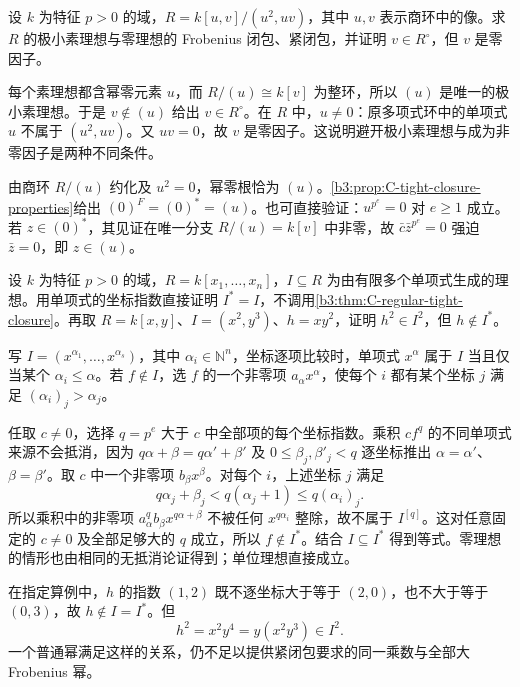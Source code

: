 
\begin{exercise}\label{b3:ex:C-tight-minimal-primes}
	设 \(k\) 为特征 \(p>0\) 的域，\(R=k[u,v]/(u^2,uv)\)，其中 \(u,v\) 表示商环中的像。求 \(R\) 的极小素理想与零理想的 Frobenius 闭包、紧闭包，并证明 \(v\in R^\circ\)，但 \(v\) 是零因子。
\end{exercise}
\begin{solution}
	每个素理想都含幂零元素 \(u\)，而 \(R/(u)\cong k[v]\) 为整环，所以 \((u)\) 是唯一的极小素理想。于是 \(v\notin(u)\) 给出 \(v\in R^\circ\)。在 \(R\) 中，\(u\ne0\)：原多项式环中的单项式 \(u\) 不属于 \((u^2,uv)\)。又 \(uv=0\)，故 \(v\) 是零因子。这说明避开极小素理想与成为非零因子是两种不同条件。

	由商环 \(R/(u)\) 约化及 \(u^2=0\)，幂零根恰为 \((u)\)。\cref{b3:prop:C-tight-closure-properties}给出 \((0)^F=(0)^*=(u)\)。也可直接验证：\(u^{p^e}=0\) 对 \(e\ge1\) 成立。若 \(z\in(0)^*\)，其见证在唯一分支 \(R/(u)=k[v]\) 中非零，故 \(\bar c\bar z^{p^e}=0\) 强迫 \(\bar z=0\)，即 \(z\in(u)\)。
\end{solution}

\begin{exercise}\label{b3:ex:C-tight-polynomial-monomials}
	设 \(k\) 为特征 \(p>0\) 的域，\(R=k[x_1,\ldots,x_n]\)，\(I\subseteq R\) 为由有限多个单项式生成的理想。用单项式的坐标指数直接证明 \(I^*=I\)，不调用\cref{b3:thm:C-regular-tight-closure}。再取 \(R=k[x,y]\)、\(I=(x^2,y^3)\)、\(h=xy^2\)，证明 \(h^2\in I^2\)，但 \(h\notin I^*\)。
\end{exercise}
\begin{solution}
	写 \(I=(x^{\alpha_1},\ldots,x^{\alpha_s})\)，其中 \(\alpha_i\in\mathbb N^n\)，坐标逐项比较时，单项式 \(x^\alpha\) 属于 \(I\) 当且仅当某个 \(\alpha_i\le\alpha\)。若 \(f\notin I\)，选 \(f\) 的一个非零项 \(a_\alpha x^\alpha\)，使每个 \(i\) 都有某个坐标 \(j\) 满足 \((\alpha_i)_j>\alpha_j\)。

	任取 \(c\ne0\)，选择 \(q=p^e\) 大于 \(c\) 中全部项的每个坐标指数。乘积 \(cf^q\) 的不同单项式来源不会抵消，因为 \(q\alpha+\beta=q\alpha'+\beta'\) 及 \(0\le\beta_j,\beta'_j<q\) 逐坐标推出 \(\alpha=\alpha'\)、\(\beta=\beta'\)。取 \(c\) 中一个非零项 \(b_\beta x^\beta\)。对每个 \(i\)，上述坐标 \(j\) 满足
	\[
		q\alpha_j+\beta_j<q(\alpha_j+1)
		\le q(\alpha_i)_j.
	\]
	所以乘积中的非零项 \(a_\alpha^q b_\beta x^{q\alpha+\beta}\) 不被任何 \(x^{q\alpha_i}\) 整除，故不属于 \(I^{[q]}\)。这对任意固定的 \(c\ne0\) 及全部足够大的 \(q\) 成立，所以 \(f\notin I^*\)。结合 \(I\subseteq I^*\) 得到等式。零理想的情形也由相同的无抵消论证得到；单位理想直接成立。

	在指定算例中，\(h\) 的指数 \((1,2)\) 既不逐坐标大于等于 \((2,0)\)，也不大于等于 \((0,3)\)，故 \(h\notin I=I^*\)。但
	\[
		h^2=x^2y^4=y(x^2y^3)\in I^2.
	\]
	一个普通幂满足这样的关系，仍不足以提供紧闭包要求的同一乘数与全部大 Frobenius 幂。
\end{solution}

